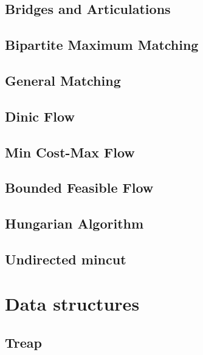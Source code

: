 \subsection{Bridges and Articulations}
\raggedbottom
\hrulefill
\subsection{Bipartite Maximum Matching}
\raggedbottom
\hrulefill
\subsection{General Matching}
\raggedbottom
\hrulefill
\subsection{Dinic Flow}
\raggedbottom
\hrulefill
\subsection{Min Cost-Max Flow}
\raggedbottom
\hrulefill
\subsection{Bounded Feasible Flow}
\raggedbottom
\hrulefill
\subsection{Hungarian Algorithm}
\raggedbottom
\hrulefill
\subsection{Undirected mincut}
\raggedbottom
\hrulefill

\section{Data structures}
\subsection{Treap}
\raggedbottom
\hrulefill
